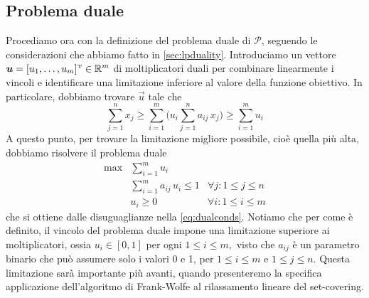 \subsection{Problema duale}
Procediamo ora con la definizione del problema duale di \( \mathcal{P} \), seguendo le considerazioni che abbiamo fatto in
\ref{sec:lpduality}.
Introduciamo un vettore \( \bm{u} = [u_1, \ldots, u_m]^{\scriptscriptstyle\mathrm{T}} \in \mathbb{R}^m \) di
moltiplicatori duali per combinare linearmente i vincoli e identificare una limitazione inferiore al valore della
funzione obiettivo. In particolare, dobbiamo trovare
\(
    \vec{u}
\)
tale che
\begin{equation}\label{eq:dualconds}
    \sum_{j = 1}^n x_j \geq \sum_{i = 1}^m \Big(u_i \sum_{j = 1}^n a_{ij}\, x_j \Big) \geq \sum_{i = 1}^m u_i
\end{equation}
A questo punto, per trovare la limitazione migliore possibile, cioè quella più alta, dobbiamo risolvere il problema
duale
\begin{equation}\label{eq:scplrdual}
    \begin{array}{lll}
        \max & \displaystyle\sum_{i = 1}^m u_i \\[20pt]
             & \displaystyle\sum_{i = 1}^m a_{ij}\,u_i \leq 1 & \forall j\colon 1 \leq j \leq n \\[20pt]
             & u_i \geq 0 & \forall i\colon 1 \leq i \leq m
    \end{array}
\end{equation}
che si ottiene dalle disuguaglianze nella \eqref{eq:dualconds}. Notiamo che per come è definito, il vincolo del problema duale
impone una limitazione superiore ai moltiplicatori, ossia \( u_i \in [0, 1] \) per ogni
\(
    1 \leq i \leq m,
\)
visto che
\(
    a_{ij}
\)
è un parametro binario che può assumere solo i valori 0 e 1, per
\(
    1 \leq i \leq m \text{ e } 1 \leq j \leq n.
\)
Questa limitazione sarà importante più avanti, quando presenteremo la specifica applicazione dell'algoritmo di
Frank-Wolfe al rilassamento lineare del set-covering.

